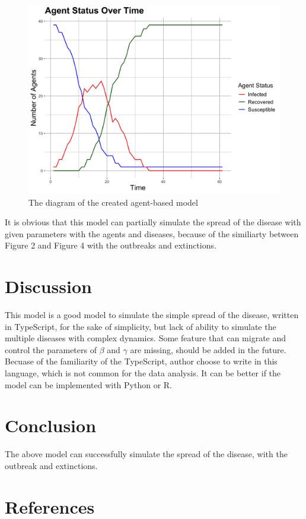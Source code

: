 \documentclass[12pt]{article}
\begin{document}
\begin{figure}[ht]
	\centering
	\includegraphics[width=0.9\linewidth]{./assets/report-20246030-132911/diagram.png}
	\caption{\scriptsize \sffamily The diagram of the created agent-based model}
\end{figure}

It is obvious that this model can partially simulate the spread of the disease with given parameters with the agents and diseases, because of the similiarty between Figure 2 and Figure 4 with the outbreaks and extinctions.

\section{Discussion}
This model is a good model to simulate the simple spread of the disease, written in TypeScript, for the sake of simplicity, but lack of ability to simulate the multiple diseases with complex dynamics.
Some feature that can migrate and control the parameters of $\beta$ and $\gamma$ are missing, should be added in the future.
Becuase of the familiarity of the TypeScript, author choose to write in this language, which is not common for the data analysis. It can be better if the model can be implemented with Python or R.

\section{Conclusion}
The above model can successfully simulate the spread of the disease, with the outbreak and extinctions.

\section{References}
\printbibliography[heading=none]
\end{document}
